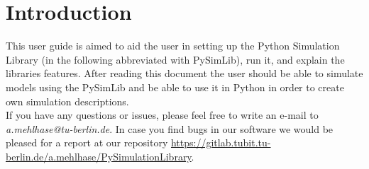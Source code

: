 \section{Introduction}
This user guide is aimed to aid the user in setting up the Python Simulation Library (in the following abbreviated with PySimLib), run it, and explain the libraries features.
After reading this document the user should be able to simulate models using the PySimLib and be able to use it in Python in order to create own simulation descriptions.
\\
If you have any questions or issues, please feel free to write an e-mail to \textit{a.mehlhase@tu-berlin.de}.
In case you find bugs in our software we would be pleased for a report at our repository \url{https://gitlab.tubit.tu-berlin.de/a.mehlhase/PySimulationLibrary}.